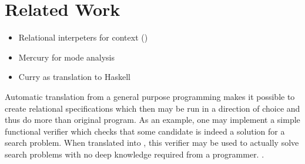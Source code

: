 \section{Related Work}

\begin{itemize}
  \item Relational interpeters for context (\cite{lozov2019relational})
  \item Mercury for mode analysis
  \item Curry as translation to Haskell
\end{itemize}

Automatic translation from a general purpose programming  makes it possible to create relational specifications which then may be run in a direction of choice and thus do more than original program.
As an example, one may implement a simple functional verifier which checks that some candidate is indeed a solution for a search problem.
When translated into \mk, this verifier may be used to actually solve search problems with no deep knowledge required from a programmer. .